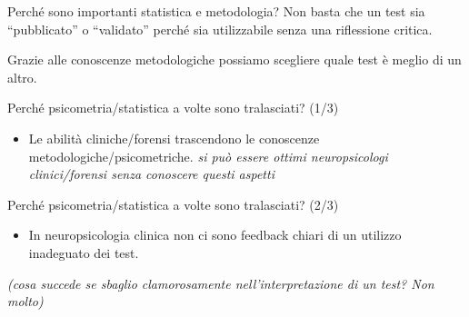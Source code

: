 \documentclass[
  ignorenonframetext,
]{beamer}
\providecommand{\tightlist}{%
  \setlength{\itemsep}{0pt}\setlength{\parskip}{0pt}}
\begin{document}
\begin{frame}{Perché sono importanti statistica e metodologia?}
\label{perchuxe9-sono-importanti-statistica-e-metodologia}
Non basta che un test sia ``pubblicato'' o ``validato'' perché sia
utilizzabile senza una riflessione critica.

\vspace{2em}

Grazie alle conoscenze metodologiche possiamo scegliere quale test è
meglio di un altro.

\pause
\vspace{2em}

\begin{center}
\end{center}
\end{frame}

\begin{frame}{Perché psicometria/statistica a volte sono tralasciati?
(1/3)}
\label{perchuxe9-psicometriastatistica-a-volte-sono-tralasciati-13}
\begin{itemize}
\tightlist
\item
  Le abilità cliniche/forensi trascendono le conoscenze
  metodologiche/psicometriche. \emph{si può essere ottimi neuropsicologi
  clinici/forensi senza conoscere questi aspetti}
\end{itemize}
\end{frame}

\begin{frame}{Perché psicometria/statistica a volte sono tralasciati?
(2/3)}
\label{perchuxe9-psicometriastatistica-a-volte-sono-tralasciati-23}
\begin{itemize}
\tightlist
\item
  In neuropsicologia clinica non ci sono feedback chiari di un utilizzo
  inadeguato dei test.
\end{itemize}

\emph{(cosa succede se sbaglio clamorosamente nell'interpretazione di un
test? Non molto)}
\end{frame}
\end{document}
